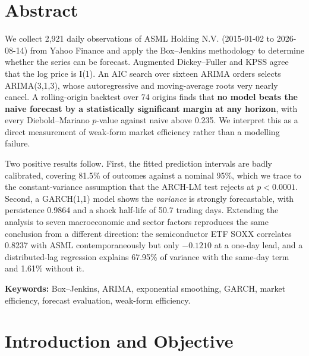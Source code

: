 \documentclass[12pt,a4paper]{article}
\begin{document}
\clearpage


\section*{Abstract}

We collect 2,921 daily observations of ASML Holding N.V. (2015-01-02 to
2026-08-14) from Yahoo Finance and apply the Box--Jenkins methodology to
determine whether the series can be forecast. Augmented Dickey--Fuller and KPSS
agree that the log price is I(1). An AIC search over sixteen ARIMA orders selects
ARIMA(3,1,3), whose autoregressive and moving-average roots very nearly cancel. A
rolling-origin backtest over 74 origins finds that \textbf{no model beats the
naive forecast by a statistically significant margin at any horizon}, with every
Diebold--Mariano $p$-value against naive above 0.235. We interpret this as a
direct measurement of weak-form market efficiency rather than a modelling
failure.

Two positive results follow. First, the fitted prediction intervals are badly
calibrated, covering 81.5\% of outcomes against a nominal 95\%, which we trace to
the constant-variance assumption that the ARCH-LM test rejects at $p < 0.0001$.
Second, a GARCH(1,1) model shows the \emph{variance} is strongly forecastable,
with persistence 0.9864 and a shock half-life of 50.7 trading days. Extending the
analysis to seven macroeconomic and sector factors reproduces the same conclusion
from a different direction: the semiconductor ETF SOXX correlates 0.8237 with
ASML contemporaneously but only $-0.1210$ at a one-day lead, and a
distributed-lag regression explains 67.95\% of variance with the same-day term
and 1.61\% without it.

\vspace{6pt}
\noindent\textbf{Keywords:} Box--Jenkins, ARIMA, exponential smoothing, GARCH,
market efficiency, forecast evaluation, weak-form efficiency.

\clearpage
\tableofcontents
\clearpage
\listoffigures
\clearpage
\listoftables
\clearpage


\section{Introduction and Objective}
\label{sec:intro}
\end{document}
